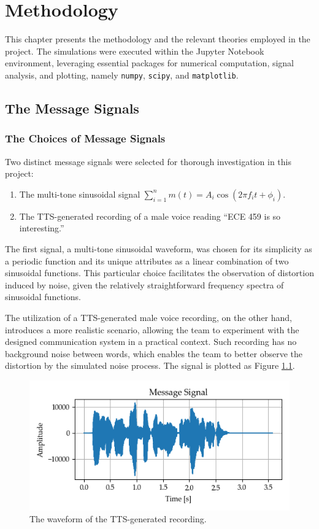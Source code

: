 \documentclass[../ECE459FinalProjectReport.tex]{subfiles}
\begin{document}
\chapter{Methodology}
This chapter presents the methodology and the relevant theories employed in the project. The simulations were executed within the Jupyter Notebook environment, leveraging essential packages for numerical computation, signal analysis, and plotting, namely \verb|numpy|, \verb|scipy|, and \verb|matplotlib|.

\section{The Message Signals}
\subsection{The Choices of Message Signals}
Two distinct message signals were selected for thorough investigation in this project:
\begin{enumerate}
    \item The multi-tone sinusoidal signal $\sum_{i=1}^n m (t) = A_i\cos(2\pi f_i t + \phi_i)$.
    \item The TTS-generated recording of a male voice reading ``ECE 459 is so interesting.''
\end{enumerate}

The first signal, a multi-tone sinusoidal waveform, was chosen for its simplicity as a periodic function and its unique attributes as a linear combination of two sinusoidal functions. This particular choice facilitates the observation of distortion induced by noise, given the relatively straightforward frequency spectra of sinusoidal functions.

The utilization of a TTS-generated male voice recording, on the other hand, introduces a more realistic scenario, allowing the team to experiment with the designed communication system in a practical context. Such recording has no background noise between words, which enables the team to better observe the distortion by the simulated noise process. The signal is plotted as Figure \ref{fig:audio-time}.
\begin{figure}[tb]
    \centering
    \includegraphics[width=0.7\linewidth]{plots/audio_time.png}
    \caption{The waveform of the TTS-generated recording.}
    \label{fig:audio-time}
\end{figure}
\end{document}
